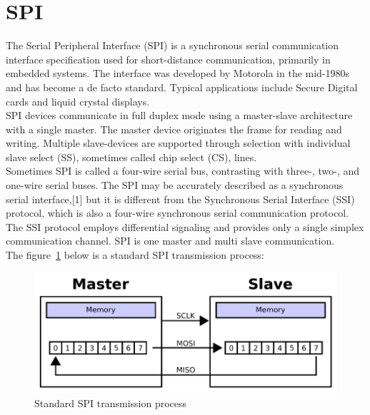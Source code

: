 \section{SPI}
\label{sec:SPI}
The Serial Peripheral Interface (SPI) is a synchronous serial communication interface specification used for short-distance communication, primarily in embedded systems. The interface was developed by Motorola in the mid-1980s and has become a de facto standard. Typical applications include Secure Digital cards and liquid crystal displays.
\\
SPI devices communicate in full duplex mode using a master-slave architecture with a single master. The master device originates the frame for reading and writing. Multiple slave-devices are supported through selection with individual slave select (SS), sometimes called chip select (CS), lines.
\\
Sometimes SPI is called a four-wire serial bus, contrasting with three-, two-, and one-wire serial buses. The SPI may be accurately described as a synchronous serial interface,[1] but it is different from the Synchronous Serial Interface (SSI) protocol, which is also a four-wire synchronous serial communication protocol. The SSI protocol employs differential signaling and provides only a single simplex communication channel. SPI is one master and multi slave communication.
\\
The figure~\ref{fig:2.12}  below is a standard SPI transmission process:
\begin{figure}[!ht]
	\centering
	\includegraphics[width=15cm]{grafiken/2.12.pdf}
	\caption{Standard SPI transmission process} 
	\label{fig:2.12}
\end{figure}
\FloatBarrier

